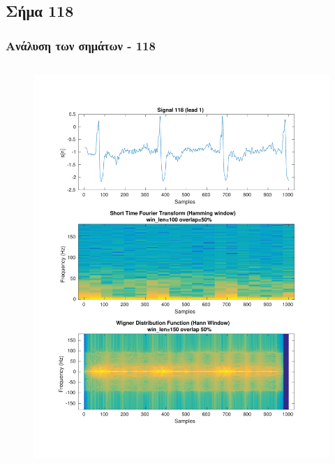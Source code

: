 \documentclass{beamer}
\begin{document}
\subsection{Σήμα 118}
\label{sig:118}
\begin{frame}
\frametitle{Ανάλυση των σημάτων - 118}

\begin{columns}
\begin{figure}
\includegraphics[width=\textwidth]{fig/118l1_stft_wdf.pdf}
\end{figure}


\end{columns}
\end{frame}
\end{document}
